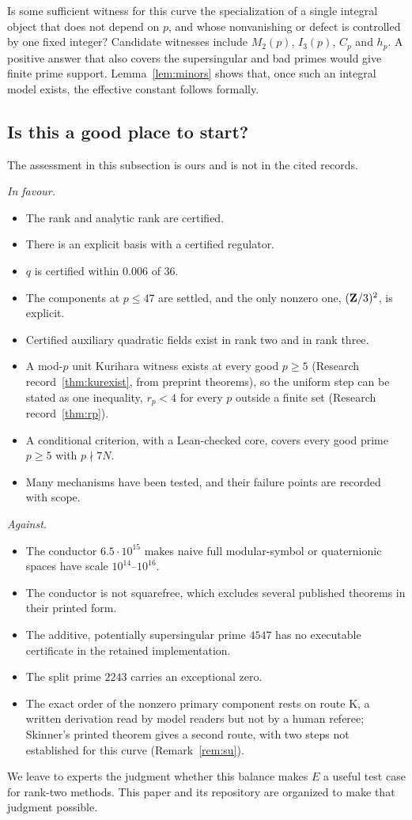 \begin{question}[\cid{O.4}]\label{q:uniform}
Is some sufficient witness for this curve the specialization of a single integral object that does not depend on $p$, and whose nonvanishing or defect is controlled by one fixed integer? Candidate witnesses include $M_2(p)$, $I_3(p)$, $C_p$ and $h_p$. A positive answer that also covers the supersingular and bad primes would give finite prime support. Lemma~\ref{lem:minors} shows that, once such an integral model exists, the effective constant follows formally.
\end{question}

\subsection{Is this a good place to start?}
The assessment in this subsection is ours and is not in the cited records.

\emph{In favour.}
\begin{itemize}[leftmargin=*]
\item The rank and analytic rank are certified.
\item There is an explicit basis with a certified regulator.
\item $q$ is certified within $0.006$ of $36$.
\item The components at $p\le47$ are settled, and the only nonzero one, $(\mathbf{Z}/3)^2$, is explicit.
\item Certified auxiliary quadratic fields exist in rank two and in rank three.
\item A mod-$p$ unit Kurihara witness exists at every good $p\ge5$ (Research record~\ref{thm:kurexist}, from preprint theorems), so the uniform step can be stated as one inequality, $r_p<4$ for every $p$ outside a finite set (Research record~\ref{thm:rp}).
\item A conditional criterion, with a Lean-checked core, covers every good prime $p\ge5$ with $p\nmid7N$.
\item Many mechanisms have been tested, and their failure points are recorded with scope.
\end{itemize}

\emph{Against.}
\begin{itemize}[leftmargin=*]
\item The conductor $6.5\cdot10^{15}$ makes naive full modular-symbol or quaternionic spaces have scale $10^{14}$--$10^{16}$.
\item The conductor is not squarefree, which excludes several published theorems in their printed form.
\item The additive, potentially supersingular prime $4547$ has no executable certificate in the retained implementation.
\item The split prime $2243$ carries an exceptional zero.
\item The exact order of the nonzero primary component rests on route K, a written derivation read by model readers but not by a human referee; Skinner's printed theorem gives a second route, with two steps not established for this curve (Remark~\ref{rem:su}).
\end{itemize}

We leave to experts the judgment whether this balance makes $E$ a useful test case for rank-two methods. This paper and its repository are organized to make that judgment possible.
